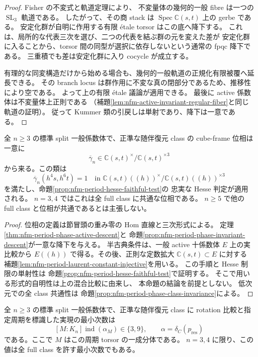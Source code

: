 \begin{proof}
Fisher の不変式と軌道定理\cite[Theorem~1.1, Lemma~2.2]{NFMFisherTernary}により、
不変量体の幾何的一般 fibre は一つの
$\operatorname{SL}_3$ 軌道である。
したがって、その商 stack は $\operatorname{Spec}\mathbb C(s,t)$ 上の gerbe である。
安定化群が自明に作用する有限 étale torsor はこの底へ降下する。
これは、局所的な代表三次を選び、二つの代表を結ぶ群の元を変えた差が
安定化群に入ることから、torsor 間の同型が選択に依存しないという通常の fpqc 降下である。
三重積でも差は安定化群に入り cocycle が成立する。

有理的な同変構造だけから始める場合も、幾何的一般軌道の正規化有限被覆へ延長できる。
その branch locus は群作用に不変な真の閉部分であるため、推移性により空である。
よって上の有限 étale 議論が適用できる。
最後に active 係数体は不変量体上正則である
（補題\ref{lem:nfm-active-invariant-regular-fiber}と同じ軌道の証明）。
従って Kummer 類の引戻しは単射であり、降下は一意である。
\end{proof}

\begin{proposition}
\label{prop:nfm-adjoint-period-all-dimensions}
全 $n\ge3$ の標準 split 一般係数体で、正準な随伴復元 class の
cube-frame 位相は一意に
\[
 \overline\gamma_n\in
 \mathbb C(s,t)^\times/\mathbb C(s,t)^{\times3}
\]
から来る。この類は
\[
 \overline\gamma_n(h^4s,h^6t)=1
 \quad\text{in }\mathbb C(s,t)((h))^\times/
                   \mathbb C(s,t)((h))^{\times3}
\]
を満たし、命題\ref{prop:nfm-period-hesse-faithful-test}の
忠実な Hesse 判定が適用される。
$n=3,4$ ではこれは全 full class に共通な位相である。
$n\ge5$ で他の full class と位相が共通であるとは主張しない。
\end{proposition}

\begin{proof}
位相の定義は節冒頭の重み零の Hom 直線と三次形式による。
定理\ref{thm:nfm-period-phase-active-descent}と
命題\ref{prop:nfm-period-phase-invariant-descent}が一意な降下を与える。
半古典条件は、一般 active 十係数体 $E$ 上の実比較から
$E((h))$ で得る。その後、正則な定数拡大
$\mathbb C(s,t)\subset E$ に対する
補題\ref{lem:nfm-period-laurent-constant-injective}を用いる。
この手順と Hesse 制限の単射性は
命題\ref{prop:nfm-period-hesse-faithful-test}で証明する。
そこで用いる形式的自明性は上の混合比較に由来し、
本命題の結論を前提としない。
低次元での全 class 共通性は
命題\ref{prop:nfm-period-phase-class-invariance}による。
\end{proof}

\begin{corollary}
\label{cor:nfm-adjoint-period-marked-minimum}
全 $n\ge3$ の標準 split 一般係数体で、正準な随伴復元 class に
rotation 比較と指定周期を標識した実現の最小次数は
\[
 [M:K_n]\operatorname{ind}(\alpha_M)\in\{3,9\},
 \qquad \alpha=\delta_C(p_{\mathrm{res}})
\]
である。ここで $M$ はこの周期 torsor の一成分体である。
$n=3,4$ に限り、この値は全 full class を許す最小次数でもある。
\end{corollary}

